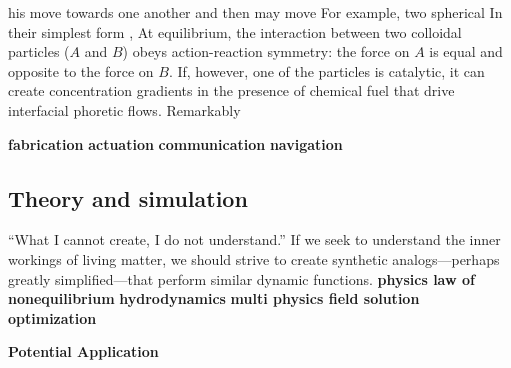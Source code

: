 his  move towards one another and then   may move   For example, two spherical  In their simplest form , At equilibrium, the interaction between two colloidal particles ($A$ and $B$) obeys action-reaction symmetry: the force on $A$ is equal and opposite to the force on $B$.  If, however, one of the particles is catalytic, it can create concentration gradients in the presence of chemical fuel that drive interfacial phoretic flows.  Remarkably 



\textbf{fabrication}
\textbf{actuation}
\textbf{communication}
\textbf{navigation}

\subsection{Theory and simulation}
``What I cannot create, I do not understand.'' If we seek to understand the inner workings of living matter, we should strive to create synthetic analogs---perhaps greatly simplified---that perform similar dynamic functions.
\textbf{physics law of nonequilibrium }
\textbf{hydrodynamics}
\textbf{multi physics field solution }
\textbf{optimization}

\textbf{Potential Application }
